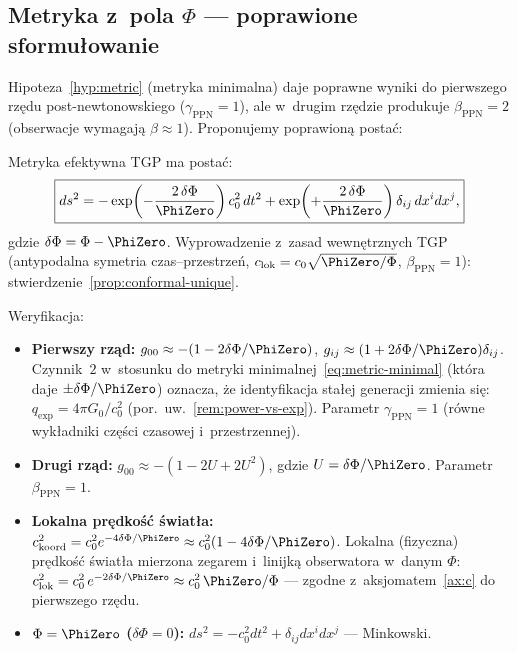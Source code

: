 \subsection{Metryka z~pola $\Phi$ ---
  poprawione sformu\l{}owanie}\label{ssec:metryka-popr}

Hipoteza~\ref{hyp:metric} (metryka minimalna) daje poprawne
wyniki do pierwszego rz\k{e}du post-newtonowskiego
($\gamma_{\mathrm{PPN}} = 1$), ale w~drugim rz\k{e}dzie
produkuje $\beta_{\mathrm{PPN}} = 2$ (obserwacje wymagaj\k{a}
$\beta \approx 1$). Proponujemy poprawion\k{a} posta\'c:

\begin{proposition}\label{hyp:metric-exp}
Metryka efektywna TGP ma posta\'c:
\begin{equation}\label{eq:metric-exp}
  \boxed{
    ds^2 = -\exp\!\left(-\frac{2\,\delta\Phi}{\PhiZero}\right)
           c_0^2\,dt^2
         + \exp\!\left(+\frac{2\,\delta\Phi}{\PhiZero}\right)
           \delta_{ij}\,dx^i dx^j,
  }
\end{equation}
gdzie $\delta\Phi = \Phi - \PhiZero$.
Wyprowadzenie z~zasad wewn\k{e}trznych TGP (antypodalna symetria
czas--przestrze\'n, $c_{\mathrm{lok}} = c_0\sqrt{\PhiZero/\Phi}$,
$\beta_{\mathrm{PPN}} = 1$): stwierdzenie~\ref{prop:conformal-unique}.
\end{proposition}

Weryfikacja:
\begin{itemize}[nosep]
  \item \textbf{Pierwszy rz\k{a}d:}
    $g_{00} \approx -(1 - 2\delta\Phi/\PhiZero)$,
    $g_{ij} \approx (1 + 2\delta\Phi/\PhiZero)\delta_{ij}$.
    Czynnik~$2$ w~stosunku do metryki minimalnej~\eqref{eq:metric-minimal}
    (kt\'ora daje $\pm\delta\Phi/\PhiZero$)
    oznacza, \.ze identyfikacja sta\l{}ej generacji zmienia si\k{e}:
    $q_{\mathrm{exp}} = 4\pi G_0/c_0^2$
    (por.\ uw.~\ref{rem:power-vs-exp}).
    Parametr $\gamma_{\mathrm{PPN}} = 1$ (r\'owne wyk\l{}adniki
    cz\k{e}\'sci czasowej i~przestrzennej). \checkmark
  \item \textbf{Drugi rz\k{a}d:}
    $g_{00} \approx -(1 - 2U + 2U^2)$, gdzie
    $U = \delta\Phi/\PhiZero$. Parametr
    $\beta_{\mathrm{PPN}} = 1$. \checkmark
  \item \textbf{Lokalna pr\k{e}dko\'s\'c \'swiat\l{}a:}
    $c_{\mathrm{koord}}^2 = c_0^2 e^{-4\delta\Phi/\PhiZero}
    \approx c_0^2(1 - 4\delta\Phi/\PhiZero)$.
    Lokalna (fizyczna) pr\k{e}dko\'s\'c \'swiat\l{}a mierzona
    zegarem i~linijk\k{a} obserwatora w~danym $\Phi$:
    $c_{\mathrm{lok}}^2 = c_0^2\,e^{-2\delta\Phi/\PhiZero}
    \approx c_0^2\,\PhiZero/\Phi$ --- zgodne z~aksjomatem~\ref{ax:c}
    do pierwszego rz\k{e}du. \checkmark
  \item \textbf{$\Phi = \PhiZero$ ($\delta\Phi = 0$):}
    $ds^2 = -c_0^2 dt^2 + \delta_{ij}dx^i dx^j$ ---
    Minkowski. \checkmark
\end{itemize}

